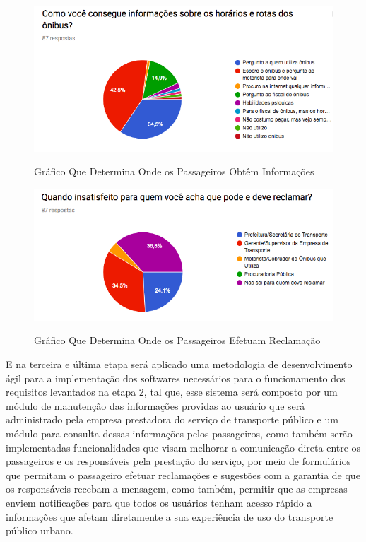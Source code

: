 \begin{figure}[H]
\caption{Gráfico Que Determina Onde os Passageiros Obtêm Informações}
\centering
\includegraphics[width=1.0\textwidth]{imagens/informacao.png}
\label{fig:informacao}
\end{figure}

\begin{figure}[H]
\caption{Gráfico Que Determina Onde os Passageiros Efetuam Reclamação}
\centering
\includegraphics[width=1.0\textwidth]{imagens/reclamacao.png}
\label{fig:reclamacao}
\end{figure}

E na terceira e última etapa será aplicado uma metodologia de desenvolvimento ágil para a implementação dos softwares necessários para o funcionamento dos requisitos levantados na etapa 2, tal que, esse sistema será composto por um módulo de manutenção das informações providas ao usuário que será administrado pela empresa prestadora do serviço de transporte público e um módulo para consulta dessas informações pelos passageiros, como também serão implementadas funcionalidades que visam melhorar a comunicação direta entre os passageiros e os responsáveis pela prestação do serviço, por meio de formulários que permitam o passageiro efetuar reclamações e sugestões com a garantia de que os responsáveis recebam a mensagem, como também, permitir que as empresas enviem notificações para que todos os usuários tenham acesso rápido a informações que afetam diretamente a sua experiência de uso do transporte público urbano.